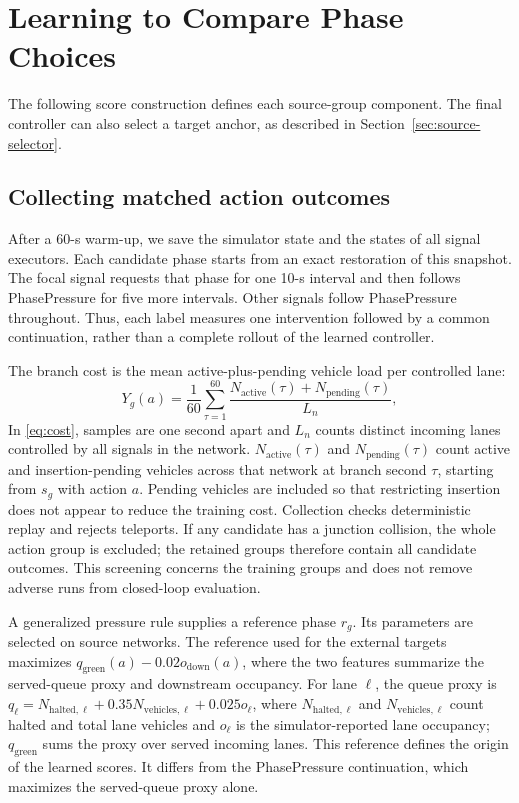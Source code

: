 \section{Learning to Compare Phase Choices}
The following score construction defines each source-group component. The final controller can also select a target anchor, as described in Section~\ref{sec:source-selector}.
\subsection{Collecting matched action outcomes}
After a 60-s warm-up, we save the simulator state and the states of all signal executors. Each candidate phase starts from an exact restoration of this snapshot. The focal signal requests that phase for one 10-s interval and then follows PhasePressure for five more intervals. Other signals follow PhasePressure throughout. Thus, each label measures one intervention followed by a common continuation, rather than a complete rollout of the learned controller.

The branch cost is the mean active-plus-pending vehicle load per controlled lane:
\begin{equation}
 Y_g(a)=\frac{1}{60}\sum_{\tau=1}^{60}
 \frac{N_{\mathrm{active}}(\tau)+N_{\mathrm{pending}}(\tau)}{L_n},
 \label{eq:cost}
\end{equation}
In \eqref{eq:cost}, samples are one second apart and $L_n$ counts distinct incoming lanes controlled by all signals in the network. $N_{\mathrm{active}}(\tau)$ and $N_{\mathrm{pending}}(\tau)$ count active and insertion-pending vehicles across that network at branch second $\tau$, starting from $s_g$ with action $a$. Pending vehicles are included so that restricting insertion does not appear to reduce the training cost. Collection checks deterministic replay and rejects teleports. If any candidate has a junction collision, the whole action group is excluded; the retained groups therefore contain all candidate outcomes. This screening concerns the training groups and does not remove adverse runs from closed-loop evaluation.

A generalized pressure rule supplies a reference phase $r_g$. Its parameters are selected on source networks. The reference used for the external targets maximizes $q_{\mathrm{green}}(a)-0.02o_{\mathrm{down}}(a)$, where the two features summarize the served-queue proxy and downstream occupancy. For lane $\ell$, the queue proxy is $q_\ell=N_{\mathrm{halted},\ell}+0.35N_{\mathrm{vehicles},\ell}+0.025o_\ell$, where $N_{\mathrm{halted},\ell}$ and $N_{\mathrm{vehicles},\ell}$ count halted and total lane vehicles and $o_\ell$ is the simulator-reported lane occupancy; $q_{\mathrm{green}}$ sums the proxy over served incoming lanes. This reference defines the origin of the learned scores. It differs from the PhasePressure continuation, which maximizes the served-queue proxy alone.

